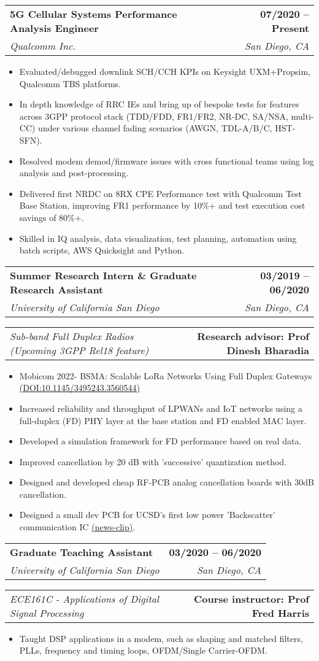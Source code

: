 \documentclass[letterpaper,11pt]{article}
\makeatletter
\newcommand{\resumeItem}[1]{
  \item\small{
    {#1 \vspace{-2pt}}
  }
}
\newcommand{\resumeSubheading}[4]{
  \vspace{-2pt}\item
    \begin{tabular*}{1.0\textwidth}[t]{l@{\extracolsep{\fill}}r}
      \textbf{#1} & \textbf{\small #2} \\
      \textit{\small#3} & \textit{\small #4} \\
    \end{tabular*}\vspace{-7pt}
}
\newcommand{\resumeProjectHeading}[2]{
    \item
    \begin{tabular*}{1.001\textwidth}{l@{\extracolsep{\fill}}r}
      \small#1 & \textbf{\small #2}\\
    \end{tabular*}\vspace{-7pt}
}
\newcommand{\resumeItemListStart}{\begin{itemize}}
\newcommand{\resumeItemListEnd}{\end{itemize}\vspace{-5pt}}
\makeatother
\begin{document}
    \resumeSubheading
      {5G Cellular Systems Performance Analysis Engineer}{07/2020 -- Present}
      {Qualcomm Inc.}{San Diego, CA}
      \resumeItemListStart
        \resumeItem{Evaluated/debugged downlink SCH/CCH KPIs on Keysight UXM+Propsim, Qualcomm TBS platforms.}
        \resumeItem{In depth knowledge of RRC IEs and bring up of bespoke tests for features across 3GPP protocol stack (TDD/FDD, FR1/FR2, NR-DC, SA/NSA, multi-CC) under various channel fading scenarios (AWGN, TDL-A/B/C, HST-SFN).}
        \resumeItem{Resolved modem demod/firmware issues with cross functional teams using log analysis and post-processing.}
        \resumeItem{Delivered first NRDC on 8RX CPE Performance test with Qualcomm Test Base Station, improving FR1 performance by 10\%+ and test execution cost savings of 80\%+.}
        \resumeItem{Skilled in IQ analysis, data visualization, test planning, automation using batch scripts, AWS Quicksight and Python.}
      \resumeItemListEnd
    \resumeSubheading
      {Summer Research Intern \& Graduate Research Assistant}{03/2019 -- 06/2020}
      {University of California San Diego}{San Diego, CA}
      \vspace{-20pt}
      \resumeProjectHeading
          {\textit{\small Sub-band Full Duplex Radios (Upcoming 3GPP Rel18 feature)}}{Research advisor: Prof Dinesh Bharadia}
      \resumeItemListStart
        \resumeItem{Mobicom 2022- BSMA: Scalable LoRa Networks Using Full Duplex Gateways \href{https://mobicom22.hotcrp.com/doc/mobicom22-final738.pdf?cap=hcav738AGhBgfFTdujnxeFgeubzndYa}{(DOI:10.1145/3495243.3560544)}}
        \resumeItem{Increased reliability and throughput of LPWANs and IoT networks using a full-duplex (FD) PHY layer at the base station and FD enabled MAC layer.}
        \resumeItem{Developed a simulation framework for FD performance based on real data.}
        \resumeItem{Improved cancellation by 20 dB with 'successive' quantization method.}
        \resumeItem{Designed and developed cheap RF-PCB analog cancellation boards with 30dB cancellation.}
        \resumeItem{Designed a small dev PCB for UCSD’s first low power 'Backscatter' communication IC \href{https://today.ucsd.edu/story/new-chip-brings-ultra-low-power-wi-fi-connectivity-to-iot-devices}{(news-clip)}.}
    \resumeItemListEnd
    
    \resumeSubheading
      {Graduate Teaching Assistant}{03/2020 -- 06/2020}
      {University of California San Diego}{San Diego, CA}
            \vspace{-20pt}
      \resumeProjectHeading
          {\textit{\small ECE161C - Applications of Digital Signal Processing}}{Course instructor: Prof Fred Harris}
      \resumeItemListStart
        \resumeItem{Taught DSP applications in a modem, such as shaping and matched filters, PLLs, frequency and timing loops, OFDM/Single Carrier-OFDM.}
    \resumeItemListEnd
\end{document}

